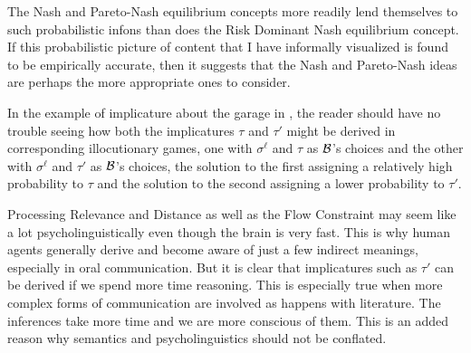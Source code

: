 The Nash and Pareto-Nash equilibrium concepts more readily lend themselves to such probabilistic infons than does the Risk Dominant Nash equilibrium concept. If this probabilistic picture of content that I have informally visualized is found to be empirically accurate, then it suggests that the Nash and Pareto-Nash ideas are perhaps the more appropriate ones to consider.

In the example of implicature about the garage in , the reader should have no trouble seeing how both the implicatures $\tau$  and $\tau'$ might be derived in corresponding illocutionary games, one with $\sigma^{\ell}$ and $\tau$ as $\cal B$'s choices and the other with $\sigma^{\ell}$ and $\tau'$ as $\cal B$'s choices, the solution to the first assigning a relatively high probability to $\tau$ and the solution to the second assigning a lower probability to $\tau'$. 


Processing Relevance and Distance as well as the Flow Constraint may seem like a lot psycholinguistically even though the brain is very fast. This is why human agents generally derive and become aware of just a few indirect meanings, especially in oral communication. But it is clear that implicatures such as $\tau'$ can be derived if we spend more time reasoning. This is especially true when more complex forms of communication are involved as happens with literature. The inferences take more time and we are more conscious of them. This is an added reason why semantics and psycholinguistics should not be conflated.




